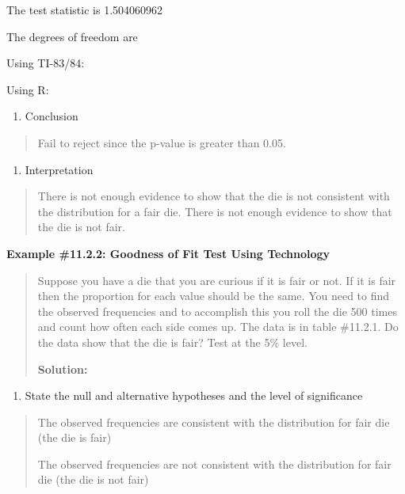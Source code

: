 \documentclass[]{book}
\providecommand{\tightlist}{%
  \setlength{\itemsep}{0pt}\setlength{\parskip}{0pt}}
\begin{document}
The test statistic is 1.504060962

The degrees of freedom are

Using TI-83/84:

Using R:

\begin{enumerate}
\def\labelenumi{\arabic{enumi}.}
\setcounter{enumi}{3}
\tightlist
\item
  Conclusion
\end{enumerate}

\begin{quote}
Fail to reject since the p-value is greater than 0.05.
\end{quote}

\begin{enumerate}
\def\labelenumi{\arabic{enumi}.}
\setcounter{enumi}{4}
\tightlist
\item
  Interpretation
\end{enumerate}

\begin{quote}
There is not enough evidence to show that the die is not consistent with the distribution for a fair die. There is not enough evidence to show that the die is not fair.
\end{quote}

\textbf{Example \#11.2.2: Goodness of Fit Test Using Technology}

\begin{quote}
Suppose you have a die that you are curious if it is fair or not. If it is fair then the proportion for each value should be the same. You need to find the observed frequencies and to accomplish this you roll the die 500 times and count how often each side comes up. The data is in table \#11.2.1. Do the data show that the die is fair? Test at the 5\% level.

\textbf{Solution:}
\end{quote}

\begin{enumerate}
\def\labelenumi{\arabic{enumi}.}
\tightlist
\item
  State the null and alternative hypotheses and the level of significance
\end{enumerate}

\begin{quote}
The observed frequencies are consistent with the distribution for fair die (the die is fair)

The observed frequencies are not consistent with the distribution for fair die (the die is not fair)
\end{quote}
\end{document}
